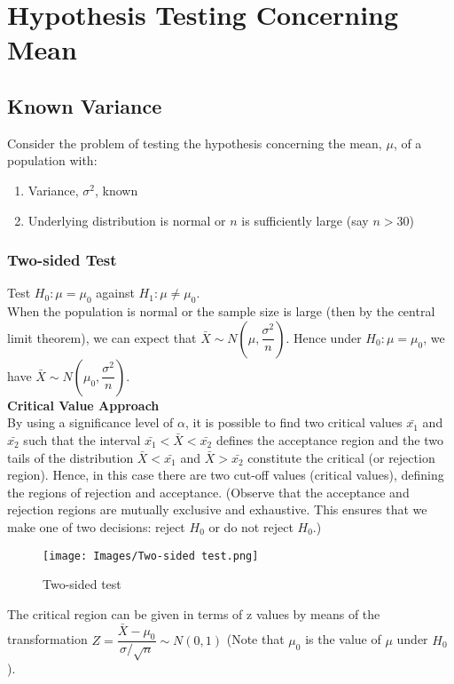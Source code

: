 \section{Hypothesis Testing Concerning Mean}
\subsection{Known Variance}
Consider the problem of testing the hypothesis concerning the mean, $\mu$, of a population with:
\begin{enumerate}
    \item Variance, $\sigma^2$, known
    \item Underlying distribution is normal or $n$ is sufficiently large (say $n > 30$)
\end{enumerate}
\subsubsection{Two-sided Test}
Test $H_0: \mu = \mu_0$ against $H_1: \mu \neq \mu_0$. \\
When the population is normal or the sample size is large (then by the central limit theorem), we can expect that $\bar{X} \sim N\left(\mu, \dfrac{\sigma^2}{n}\right)$. Hence under $H_0: \mu = \mu_0$, we have $\bar{X} \sim N\left(\mu_0, \dfrac{\sigma^2}{n}\right)$. \\
\textbf{Critical Value Approach} \\
By using a significance level of $\alpha$, it is possible to find two critical values $\bar{x_1}$ and $\bar{x_2}$ such that the interval $\bar{x_1} < \bar{X} < \bar{x_2}$ defines the acceptance region and the two tails of the distribution $\bar{X} < \bar{x_1}$ and $\bar{X} > \bar{x_2}$ constitute the critical (or rejection region). Hence, in this case there are two cut-off values (critical values), defining the regions of rejection and acceptance. (Observe that the acceptance and rejection regions are mutually exclusive and exhaustive. This ensures that we make one of two decisions: reject $H_0$ or do not reject $H_0$.) \\
\begin{figure}[ht]
    \centering
    \texttt{[image: Images/Two-sided test.png]}
    \caption{Two-sided test}
    \label{fig:my_label}
\end{figure}
The critical region can be given in terms of z values by means of the transformation $Z = \dfrac{\bar{X} - \mu_0}{\sigma/\sqrt{n}} \sim N(0,1)$ (Note that $\mu_0$ is the value of $\mu$ under $H_0$). \\
